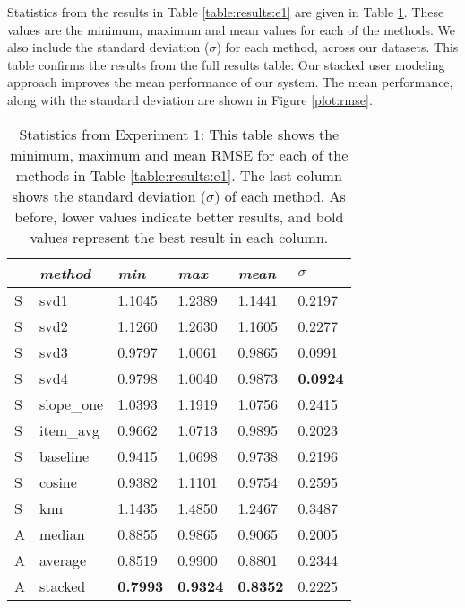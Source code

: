 Statistics from the results in Table \ref{table:results:e1} 
are given in Table \ref{table:results:e1:sum}.
These values are the minimum, maximum and mean values
for each of the methods. We also include
the standard deviation ($\sigma$) for each method,
across our datasets.
This table confirms the results from the full results table:
Our stacked user modeling approach improves the mean performance
of our system.
The mean performance, along with the standard deviation
are shown in Figure \ref{plot:rmse}.

\begin{table}
  \begin{tabular*}{\textwidth}{ l p{3cm} p{2cm} p{2cm} p{2cm} p{2cm} }
    \toprule
      ~ & \emph{method} & 
      \emph{min} & \emph{max} & \emph{mean} & $\sigma$\\
    \midrule
    S & svd1          & 1.1045	& 1.2389	& 1.1441	& 0.2197 \\
    S & svd2          & 1.1260	& 1.2630	& 1.1605	& 0.2277 \\
    S & svd3          & 0.9797	& 1.0061	& 0.9865	& 0.0991 \\
    S & svd4          & 0.9798	& 1.0040	& 0.9873	& \textbf{0.0924} \\
    S & slope\_one    & 1.0393	& 1.1919	& 1.0756	& 0.2415 \\
    S & item\_avg     & 0.9662	& 1.0713	& 0.9895	& 0.2023 \\
    S & baseline       & 0.9415	& 1.0698	& 0.9738	& 0.2196 \\
    S & cosine   	    & 0.9382	& 1.1101	& 0.9754	& 0.2595 \\
    S & knn       	  & 1.1435	& 1.4850	& 1.2467	& 0.3487 \\
    \midrule            
    A & median    	  & 0.8855	& 0.9865	& 0.9065	& 0.2005 \\
    A & average    	  & 0.8519	& 0.9900	& 0.8801	& 0.2344 \\
    A & stacked       & \textbf{0.7993}	& \textbf{0.9324}	& \textbf{0.8352}	& 0.2225 \\
    \bottomrule
  \end{tabular*}
  \caption[Statistics from Experiment 1]{
      Statistics from Experiment 1: 
      This table shows the minimum, maximum and mean RMSE for each of the methods in Table \ref{table:results:e1}.
      The last column shows the standard deviation ($\sigma$) of each method.
      As before, lower values indicate better results, and bold values
      represent the best result in each column.
    }
  \label{table:results:e1:sum}
\end{table}


